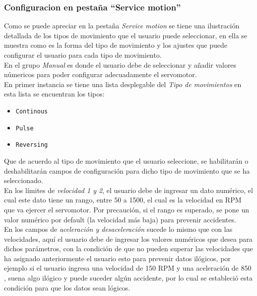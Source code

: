 \documentclass[12pt,titlepage]{article}
\begin{document}
\subsubsection{Configuracion en pestaña ``Service motion''}
Como se puede apreciar  en la pestaña \textit{Service motion}  se tiene una ilustración detallada de los tipos de movimiento que el usuario puede seleccionar, en ella se muestra como es la forma del tipo de movimiento y los ajustes que puede configurar el usuario para cada tipo de movimiento. \\ 

En el grupo \textit{Manual} es donde el usuario debe de seleccionar y añadir valores númericos para poder configurar adecuadamente el servomotor. \\

En primer instancia se tiene una lista desplegable del \textit{Tipo de movimientos} en esta lista se encuentran los tipos: \\ 
\begin{itemize}
\item \texttt{Continous}
\item \texttt{Pulse}
\item \texttt{Reversing}
\end{itemize}

Que de acuerdo al tipo de movimiento que el usuario seleccione, se habilitarán o deshabilitarán campos de configuración para dicho tipo de movimiento que se ha seleccionado. \\

En los límites de \textit{velocidad 1 y 2}, el usuario debe de ingresar un dato numérico, el cual este dato tiene un rango, entre 50 a 1500, el cual es la velocidad en RPM que va ejercer el servomotor. Por precaución, si el rango es superado, se pone un valor numérico por default (la velocidad más baja) para prevenir accidentes. \\ 

En los campos de \textit{aceleración y desaceleración}  sucede lo mismo que con las velocidades, aquí el usuario debe de ingresar los valores numéricos que desea para dichos parámetros, con la condición de que no pueden superar las velocidades que ha asignado anteriormente el usuario esto para prevenir datos ilógicos, por ejemplo si el usuario ingresa una velocidad de 150 RPM y una aceleración de 850 , suena  algo ilógico y puede suceder algún accidente, por lo cual se estableció esta condición para que los datos sean lógicos. \\ 
\end{document}
